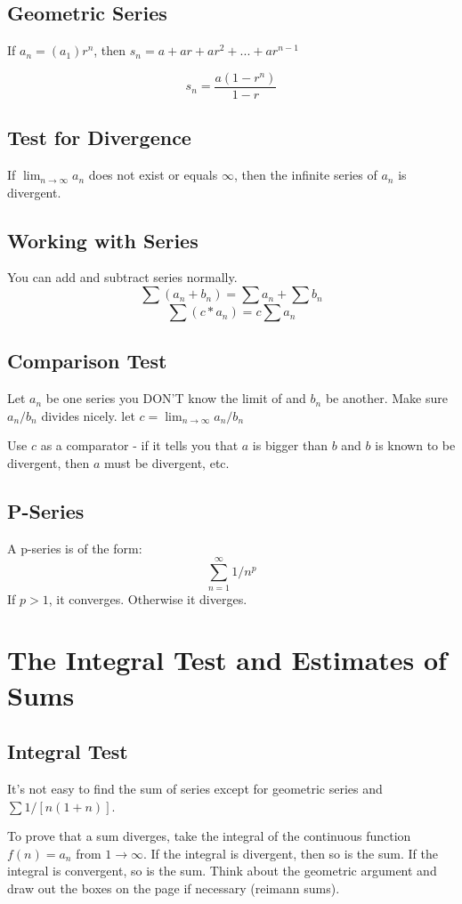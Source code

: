 \documentclass[a4paper,12pt]{report}
\begin{document}
\subsection{Geometric Series}
If $a_n = (a_1)r^n$, then $s_n = a + ar + ar^2 + ... + ar^{n-1}$

$$s_n = \frac{a(1-r^n)}{1-r}$$

\subsection{Test for Divergence}
If $\lim_{n \to \infty} a_n$ does not exist or equals $\infty$, then the infinite series of $a_n$ is divergent.

\subsection{Working with Series}
You can add and subtract series normally.
$$\sum (a_n + b_n) = \sum a_n + \sum b_n$$
$$\sum (c * a_n) = c \sum a_n$$

\subsection{Comparison Test}
Let $a_n$ be one series you DON'T know the limit of and $b_n$ be another. Make sure $a_n/b_n$ divides nicely. let $c = \lim_{n \to \infty}a_n/b_n$

Use $c$ as a comparator - if it tells you that $a$ is bigger than $b$ and $b$ is known to be divergent, then $a$ must be divergent, etc.

\subsection{P-Series}
A p-series is of the form: $$\sum_{n=1}^{\infty} 1/{n^p}$$
If $p > 1$, it converges. Otherwise it diverges.

\section{The Integral Test and Estimates of Sums}
\subsection{Integral Test}
It's not easy to find the sum of series except for geometric series and $\sum 1/[n(1+n)]$. 

To prove that a sum diverges, take the integral of the continuous function $f(n) = a_n$ from $1 \to \infty$. If the integral is divergent, then so is the sum. If the integral is convergent, so is the sum. Think about the geometric argument and draw out the boxes on the page if necessary (reimann sums). 
\end{document}
